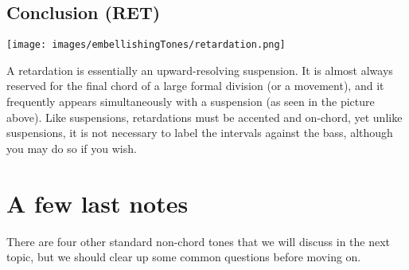 \documentclass{book}
\begin{document}
\hypertarget{conclusion-ret}{%
\subsection{Conclusion (RET)}\label{conclusion-ret}}

\texttt{[image: images/embellishingTones/retardation.png]}

A retardation is essentially an upward-resolving suspension. It is almost
always reserved for the final chord of a large formal division (or a
movement), and it frequently appears simultaneously with a suspension (as seen
in the picture above). Like suspensions, retardations must be accented and
on-chord, yet unlike suspensions, it is not necessary to label the intervals
against the bass, although you may do so if you wish.

\hypertarget{a-few-last-notes}{%
\section{A few last notes}\label{a-few-last-notes}}

There are four other standard non-chord tones that we will discuss in the next
topic, but we should clear up some common questions before moving on.
\end{document}
